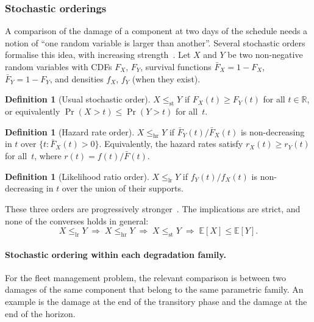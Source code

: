 \documentclass[11pt,a4paper]{article}
\theoremstyle{plain}
\theoremstyle{definition}
\newtheorem{definition}[theorem]{Definition}
\theoremstyle{remark}
\begin{document}
\subsubsection{Stochastic orderings}
\label{sec:stoch_orders}

A comparison of the damage of a component at two days of the schedule needs a notion of ``one random variable is larger than another''.
Several stochastic orders formalise this idea, with increasing strength~\cite{ShakedShanthikumar2007,WikiStochDom}.
Let $X$ and $Y$ be two non-negative random variables with CDFs $F_X$, $F_Y$, survival functions $\bar F_X = 1-F_X$, $\bar F_Y = 1-F_Y$, and densities $f_X$, $f_Y$ (when they exist).

\begin{definition}[Usual stochastic order]\label{def:st}
  $X \le_{\mathrm{st}} Y$ if $F_X(t) \ge F_Y(t)$ for all $t \in \mathbb{R}$,
  or equivalently $\Pr(X > t) \le \Pr(Y > t)$ for all~$t$.
\end{definition}

\begin{definition}[Hazard rate order]\label{def:hr}
  $X \le_{\mathrm{hr}} Y$ if $\bar F_Y(t)/\bar F_X(t)$ is non-decreasing in $t$ over $\{t : \bar F_X(t) > 0\}$.
  Equivalently, the hazard rates satisfy $r_X(t) \ge r_Y(t)$ for all~$t$, where $r(t) = f(t)/\bar F(t)$.
\end{definition}

\begin{definition}[Likelihood ratio order]\label{def:lr}
  $X \le_{\mathrm{lr}} Y$ if $f_Y(t)/f_X(t)$ is non-decreasing in $t$ over the union of their supports.
\end{definition}

These three orders are progressively stronger~\cite[Ch.~1]{ShakedShanthikumar2007}.
The implications are strict, and none of the converses holds in general:
\begin{equation}\label{eq:order_implications}
  X \le_{\mathrm{lr}} Y
  \;\Longrightarrow\;
  X \le_{\mathrm{hr}} Y
  \;\Longrightarrow\;
  X \le_{\mathrm{st}} Y
  \;\Longrightarrow\;
  \mathbb{E}[X] \le \mathbb{E}[Y].
\end{equation}

\paragraph{Stochastic ordering within each degradation family.}

For the fleet management problem, the relevant comparison is between two damages of the same component that belong to the same parametric family.
An example is the damage at the end of the transitory phase and the damage at the end of the horizon.
\end{document}
